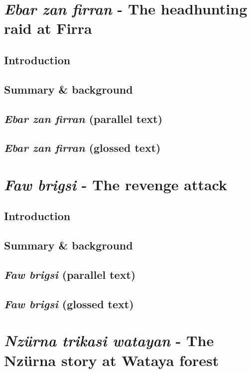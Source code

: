 \documentclass[output=book,
		  ]{langscibook}
\begin{document}
\chapter{\textit{Ebar zan firran} - The headhunting raid at Firra}\label{text:ebarzanfirran}
\section{Introduction}
    
\section{Summary \& background}
    
\section{\textit{Ebar zan firran} (parallel text)}
    
    \newpage
\section{\textit{Ebar zan firran} (glossed text)}
    

\chapter{\textit{Faw brigsi} - The revenge attack}\label{text:fawbrigsi}
\section{Introduction}
    
\section{Summary \& background}
    
\section{\textit{Faw brigsi} (parallel text)}
    
    \newpage
\section{\textit{Faw brigsi} (glossed text)}
    

\chapter{\textit{Nzürna trikasi watayan} - The Nzürna story at Wataya forest}\label{text:nzurna-marua}
\end{document}
